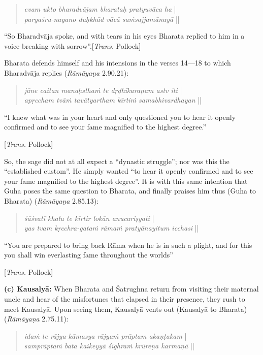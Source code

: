 \begin{quote}
{{\sl evam ukto bharadvājam bharataḥ pratyuvāca ha}}\label{verse26} |\\
{\sl paryaśru-nayano duḥkhād vācā saṁsajjamānayā} || 
\end{quote}
\vskip -6pt

\begin{myquote}
“So Bharadvāja spoke, and with tears in his eyes Bharata replied to him in a voice breaking with sorrow”.\hfill [{\sl Trans.} Pollock]  
\end{myquote}

Bharata defends himself and his intensions in the verses 14---18 to which Bharadvāja replies ({\sl Rāmāyaṇa} 2.90.21):
\vskip -6pt

\begin{quote}
{{\sl jāne caitan manaḥsthaṁ te dṛḍhīkaraṇam astv iti}}\label{verse27} |\\
{\sl apṛccham tvāṁ tavātyartham kīrtiṁ samabhivardhayan} || 
\end{quote}
\vskip -5pt

\begin{myquote}
“I knew what was in your heart and only questioned you to hear it openly confirmed and to see your fame magnified to the highest degree.” 
\vskip -2pt

\hfill[{\sl Trans.} Pollock]
\end{myquote}

So, the sage did not at all expect a “dynastic struggle”; nor was this the “established custom”. He simply wanted “to hear it openly confirmed and to see your fame magnified to the highest degree”. It is with this same intention that Guha poses the same question to Bharata, and finally praises him thus (Guha to Bharata) ({\sl Rāmāyaṇa} 2.85.13): 
\begin{quote}
{{\sl śāśvatī khalu te kīrtir lokān anucariṣyati}}\label{verse25} |\\
{\sl yas tvam kṛcchra-gataṁ rāmaṁ pratyānayitum icchasi} || 
\end{quote}

\begin{myquote}
“You are prepared to bring back Rāma when he is in such a plight, and for this you shall win everlasting fame throughout the worlds”

\hfill [{\sl Trans.} Pollock]
\end{myquote}

\noindent
\textbf{(c) Kausalyā:}  When Bharata and Śatrughna return from visiting their maternal uncle and hear of the misfortunes that elapsed in their presence, they rush to meet Kausalyā. Upon seeing them, Kausalyā vents out (Kausalyā to Bharata) ({\sl Rāmāyaṇa} 2.75.11): 
\begin{quote}
{{\sl idaṁ te rājya-kāmasya rājyaṁ prāptam akaṇṭakam}}\label{verse24} |\\
{\sl samprāptaṁ bata kaikeyyā śīghraṁ krūreṇa karmaṇā} || 
\end{quote}

